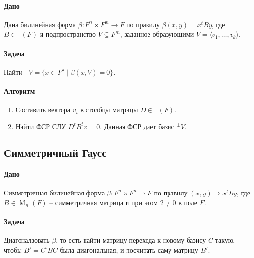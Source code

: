 \documentclass{article}
\newcommand{\MatrixDim}[3]{\mathop{\mathrm{M}_{#2\,#3}}(#1)}
\begin{document}
\paragraph{Дано} Дана билинейная форма $\beta\colon F^n\times F^m \to F$ по правилу $\beta(x,y) = x^t B y$, где $B\in\MatrixDim{F}{n}{m}$ и подпространство $V\subseteq F^m$, заданное образующими $V = \langle v_1,\ldots,v_k\rangle$.

\paragraph{Задача} Найти ${}^\bot V = \{x\in F^n \mid \beta(x, V) = 0\}$.


\paragraph{Алгоритм}
\begin{enumerate}
\item Составить вектора $v_i$ в столбцы матрицы $D \in \MatrixDim{F}{n}{k}$.

\item Найти ФСР СЛУ $D^tB^t x = 0$. Данная ФСР дает базис ${}^\bot V$.
\end{enumerate}

\subsection{Симметричный Гаусс}

\paragraph{Дано} Симметричная билинейная форма $\beta\colon F^n\times F^n \to F$ по правилу $(x,y)\mapsto x^t B y$, где $B\in \operatorname{M}_n(F)$ -- симметричная матрица и при этом $2\neq 0$  в поле $F$.

\paragraph{Задача} Диагоналзовать $\beta$, то есть найти матрицу перехода к новому базису $C$ такую, чтобы $B' = C^t B C$ была диагональная, и посчитать саму матрицу $B'$.
\end{document}
